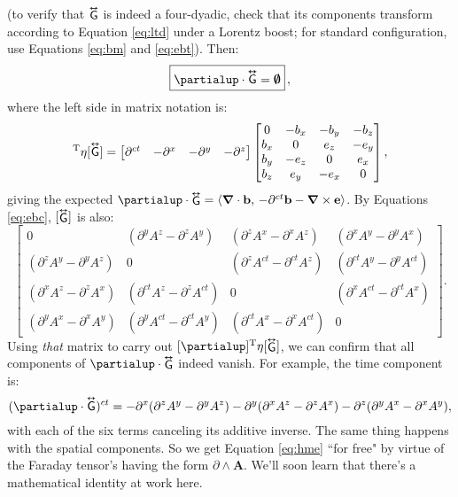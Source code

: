 \documentclass[12pt]{article}
\renewcommand{\vv}[1]{\mathbf{#1}}
\newcommand{\del}{\boldsymbol{\nabla}}
\newcommand{\tightoverset}[2]{%
  \mathop{#2}\limits^{\vbox to -.5ex{\kern-0.75ex\hbox{$#1$}\vss}}}
\newcommand{\inlinedy}[1]{\tightoverset{\text{\tiny$\bm\leftrightarrow$}}{#1}}
\newcommand{\capdy}[1]{ \overset{ \text{\tiny$\bm\leftrightarrow$} }{\vphantom{\text{\small{A}}}\smash{#1}} }
\begin{document}
(to verify that $\inlinedy{\mathsf{G}}$ is indeed a four-dyadic, check that its components transform according to Equation \ref{eq:ltd} under a Lorentz boost; for standard configuration, use Equations \ref{eq:bm} and \ref{eq:ebt}). Then:
\begin{equation}\label{eq:hme}
\boxed{ \vphantom{A_{A_A}} \partialup \cdot \capdy{\mathsf{G}} = \textrm{\mbox{\boldmath $\emptyset$}} } \, ,
\end{equation}
where the left side in matrix notation is:
\begin{equation*}
[\partialup]^{\mathrm{T}} \eta [\capdy{\mathsf{G}}]
=
\begin{bmatrix}
\partial^{ct} & - \partial^x & - \partial^y & - \partial^z
\end{bmatrix}
\begin{bmatrix}
0 & -b_x & -b_y & -b_z \\
b_x & 0 & e_z & -e_y \\
b_y & -e_z & 0 & e_x \\
b_z & e_y & -e_x & 0
\end{bmatrix} ,
\end{equation*}
giving the expected $\partialup \cdot \inlinedy{\mathsf{G}} = \langle \del \cdot \vv b , \, - \partial^{ct} \vv b - \del \times \vv e \rangle$. By Equations \ref{eq:ebc}, $[\inlinedy{\mathsf{G}}]$ is also:
\begin{equation*}
\begin{bmatrix}
0 & ( \partial^y A^z - \partial^z A^y ) & ( \partial^z A^x - \partial^x A^z ) & ( \partial^x A^y - \partial^y A^x ) \\[1.5ex]
( \partial^z A^y - \partial^y A^z ) & 0 & ( \partial^z A^{ct} - \partial^{ct} A^z ) & ( \partial^{ct} A^y - \partial^y A^{ct} ) \\[1.5ex]
( \partial^x A^z - \partial^z A^x ) & ( \partial^{ct} A^z - \partial^z A^{ct} ) & 0 & ( \partial^x A^{ct} - \partial^{ct} A^x ) \\[1.5ex]
( \partial^y A^x - \partial^x A^y ) & ( \partial^y A^{ct} - \partial^{ct} A^y ) & ( \partial^{ct} A^x - \partial^x A^{ct} ) & 0
\end{bmatrix} .
\end{equation*}
Using \emph{that} matrix to carry out $[\partialup]^{\mathrm{T}} \eta [\inlinedy{\mathsf{G}}]$, we can confirm that all components of $\partialup \cdot \inlinedy{\mathsf{G}}$ indeed vanish. For example, the time component is:
\begin{equation*}
(\partialup \cdot \capdy{\mathsf{G}})^{ct} = - \partial^x ( \partial^z A^y - \partial^y A^z ) - \partial^y ( \partial^x A^z - \partial^z A^x ) - \partial^z ( \partial^y A^x - \partial^x A^y ) ,
\end{equation*}
with each of the six terms canceling its additive inverse. The same thing happens with the spatial components. So we get Equation \ref{eq:hme} ``for free" by virtue of the Faraday tensor's having the form $\partialup \wedge \vv A$. We'll soon learn that there's a mathematical identity at work here.
\end{document}
